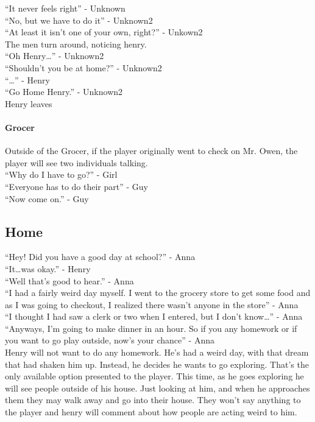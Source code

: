 \documentclass[12pt, a4paper, titlepage]{article}
\begin{document}
	``It never feels right'' - Unknown\\
	``No, but we have to do it'' - Unknown2\\
	``At least it isn't one of your own, right?''  - Unkown2\\

	The men turn around, noticing henry.\\

	``Oh Henry\ldots'' - Unknown2\\
	``Shouldn't you be at home?'' - Unknown2\\
	``\ldots'' - Henry\\
	``Go Home Henry.'' - Unknown2\\

	Henry leaves

        \paragraph{Grocer}
        Outside of the Grocer, if the player originally went to check on Mr. Owen, the player will see two individuals talking.\\

	``Why do I have to go?'' - Girl\\
	``Everyone has to do their part'' - Guy\\
	``Now come on.'' - Guy\\        

        \subsection{Home}

            ``Hey! Did you have a good day at school?'' - Anna\\
            ``It\dots was okay.'' - Henry\\
            ``Well that's good to hear.'' - Anna\\
            ``I had a fairly weird day myself. I went to the grocery store to get some food and as I was going to checkout, I realized there wasn't anyone in the store'' - Anna\\
            ``I thought I had saw a clerk or two when I entered, but I don't know\ldots'' - Anna\\
            ``Anyways, I'm going to make dinner in an hour. So if you any homework or if you want to go play outside, now's your chance'' - Anna\\

            Henry will not want to do any homework. He's had a weird day, with that dream that had shaken him up. Instead, he decides he wants to go exploring. That's the only available 		   option presented to the player. This time, as he goes exploring he will see people outside of his house. Just looking at him, and when he approaches them they may walk away 		   and go into their house. They won't say anything to the player and henry will comment about how people are acting weird to him.
            
\end{document}
